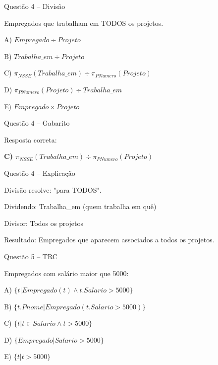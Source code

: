 \documentclass{beamer}
\begin{document}
\begin{frame}{Questão 4 – Divisão}

Empregados que trabalham em TODOS os projetos.

A) $Empregado \div Projeto$

B) $Trabalha\_em \div Projeto$

C) $\pi_{NSSE}(Trabalha\_em) \div \pi_{PNumero}(Projeto)$

D) $\pi_{PNumero}(Projeto) \div Trabalha\_em$

E) $Empregado \times Projeto$

\end{frame}





\begin{frame}{Questão 4 – Gabarito}

Resposta correta:

\Large \textbf{C) $\pi_{NSSE}(Trabalha\_em) \div \pi_{PNumero}(Projeto)$}

\end{frame}





\begin{frame}{Questão 4 – Explicação}

Divisão resolve:
"para TODOS".

Dividendo:
Trabalha_em (quem trabalha em quê)

Divisor:
Todos os projetos

Resultado:
Empregados que aparecem associados a todos os projetos.

\end{frame}









\begin{frame}{Questão 5 – TRC}

Empregados com salário maior que 5000:

A) $\{ t | Empregado(t) \land t.Salario > 5000 \}$

B) $\{ t.Pnome | Empregado(t.Salario > 5000) \}$

C) $\{ t | t \in Salario \land t > 5000 \}$

D) $\{ Empregado | Salario > 5000 \}$

E) $\{ t | t > 5000 \}$

\end{frame}
\end{document}

